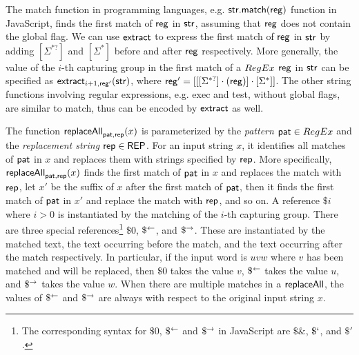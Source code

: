 \begin{remark}
The match function in programming languages, e.g. $\sf str.match(reg)$ function in JavaScript, finds the first match of $\sf reg$ in $\sf str$,  assuming that $\sf reg$ does not contain the global flag. We can use $\mathsf{extract}$ to express the first match of $\sf reg$ in $\sf str$ by adding $[\Sigma^{*?}]$ and $[\Sigma^*]$ before and after $\sf reg$ respectively. More generally, the value of the $i$-th capturing group in the first match of a ${RegEx}$ $\sf reg$ in $\sf str$ can be specified as $\mathsf{extract}_{i+1, {\sf reg'}}({\sf str})$, where ${\sf reg'} = [[[\Sigma^{*?}] \cdot ({\sf reg})] \cdot [\Sigma^*]]$. The other string functions involving regular expressions, e.g. {\sf exec} and {\sf test}, without global flags, are similar to {\sf match}, thus can be encoded by $\mathsf{extract}$ as well.
\end{remark}

The function $\mathsf{replaceAll}_{\mathsf{pat}, \mathsf{rep}}(x)$ is parameterized by the \emph{pattern} $\mathsf{pat} \in {RegEx}$ and the \emph{replacement string} $\mathsf{rep} \in {\sf REP}$.
For an input string $x$, it identifies all matches of $\mathsf{pat}$ in $x$ and replaces them with strings specified by $\mathsf{rep}$. More specifically, $\mathsf{replaceAll}_{\mathsf{pat}, \mathsf{rep}}(x)$ finds the first match of $\mathsf{pat}$ in $x$ and replaces the match with $\mathsf{rep}$, let $x'$ be the suffix of $x$ after the first match of $\mathsf{pat}$,  then it finds the first match of $\mathsf{pat}$ in $x'$ and replace the match with $\mathsf{rep}$, and so on.
%
A reference $\$i$ where $i > 0$ is instantiated by the matching of the $i$-th capturing group.
There are three special references\footnote{
    The corresponding syntax for $\$0$, $\$^{\leftarrow}$ and $\$^{\rightarrow}$ in JavaScript are $\$\&$, $\$`$, and $\$'$.
} $\$0$, $\$^{\leftarrow}$, and $\$^{\rightarrow}$.
These are instantiated by the matched text, the text occurring before the match, and the text occurring after the match respectively.
In particular, if the input word is $u v w$ where $v$ has been matched and will be replaced, then $\$0$ takes the value $v$, $\$^{\leftarrow}$ takes the value $u$, and $\$^{\rightarrow}$ takes the value $w$.
When there are multiple matches in a $\mathsf{replaceAll}$, the values of $\$^{\leftarrow}$ and $\$^{\rightarrow}$ are always with respect to the original input string $x$.


